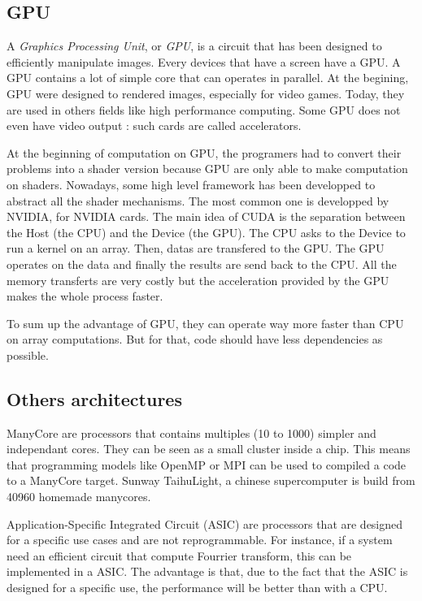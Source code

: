 \subsection{GPU}
A \emph{Graphics Processing Unit}, or \emph{GPU}, is a circuit that has been designed to efficiently manipulate images. Every devices that have a screen have a GPU. A GPU contains a lot of simple core that can operates in parallel. At the begining, GPU were designed to rendered images, especially for video games. Today, they are used in others fields like high performance computing. Some GPU does not even have video output : such cards are called accelerators.

At the beginning of computation on GPU, the programers had to convert their problems into a shader version because GPU are only able to make computation on shaders. Nowadays, some high level framework has been developped to abstract all the shader mechanisms. The most common one is  developped by NVIDIA, for NVIDIA cards. The main idea of CUDA is the separation between the Host (the CPU) and the Device (the GPU). The CPU asks to the Device to run a kernel on an array. Then, datas are transfered to the GPU. The GPU operates on the data and finally the results are send back to the CPU. All the memory transferts are very costly but the acceleration provided by the GPU makes the whole process faster. 

To sum up the advantage of GPU, they can operate way more faster than CPU on array computations. But for that, code should have less dependencies as possible.

\subsection{Others architectures}
ManyCore are processors that contains multiples (10 to 1000) simpler and independant cores. They can be seen as a small cluster inside a chip. This means that programming models like OpenMP or MPI can be used to compiled a code to a ManyCore target. Sunway TaihuLight, a chinese supercomputer is build from 40960 homemade manycores.

Application-Specific Integrated Circuit (ASIC) are processors that are designed for a specific use cases and are not reprogrammable. For instance, if a system need an efficient circuit that compute Fourrier transform, this can be implemented in a ASIC. The advantage is that, due to the fact that the ASIC is designed for a specific use, the performance will be better than with a CPU.

